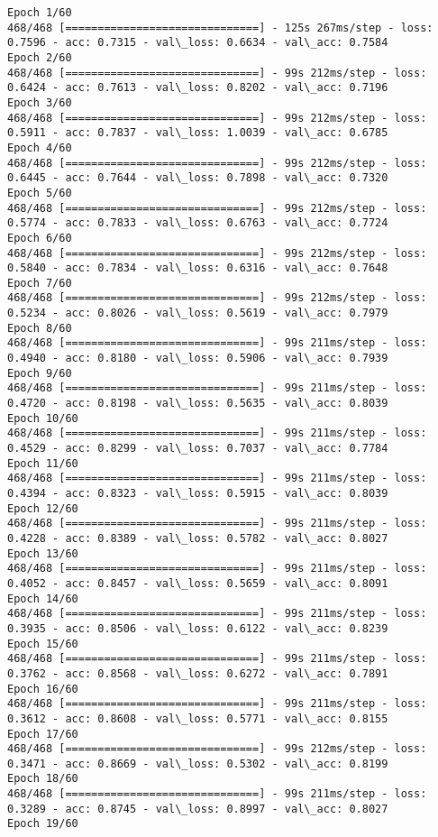 \documentclass[11pt]{article}
\begin{document}
    \begin{Verbatim}[commandchars=\\\{\}]
Epoch 1/60
468/468 [==============================] - 125s 267ms/step - loss: 0.7596 - acc: 0.7315 - val\_loss: 0.6634 - val\_acc: 0.7584
Epoch 2/60
468/468 [==============================] - 99s 212ms/step - loss: 0.6424 - acc: 0.7613 - val\_loss: 0.8202 - val\_acc: 0.7196
Epoch 3/60
468/468 [==============================] - 99s 212ms/step - loss: 0.5911 - acc: 0.7837 - val\_loss: 1.0039 - val\_acc: 0.6785
Epoch 4/60
468/468 [==============================] - 99s 212ms/step - loss: 0.6445 - acc: 0.7644 - val\_loss: 0.7898 - val\_acc: 0.7320
Epoch 5/60
468/468 [==============================] - 99s 212ms/step - loss: 0.5774 - acc: 0.7833 - val\_loss: 0.6763 - val\_acc: 0.7724
Epoch 6/60
468/468 [==============================] - 99s 212ms/step - loss: 0.5840 - acc: 0.7834 - val\_loss: 0.6316 - val\_acc: 0.7648
Epoch 7/60
468/468 [==============================] - 99s 212ms/step - loss: 0.5234 - acc: 0.8026 - val\_loss: 0.5619 - val\_acc: 0.7979
Epoch 8/60
468/468 [==============================] - 99s 211ms/step - loss: 0.4940 - acc: 0.8180 - val\_loss: 0.5906 - val\_acc: 0.7939
Epoch 9/60
468/468 [==============================] - 99s 211ms/step - loss: 0.4720 - acc: 0.8198 - val\_loss: 0.5635 - val\_acc: 0.8039
Epoch 10/60
468/468 [==============================] - 99s 211ms/step - loss: 0.4529 - acc: 0.8299 - val\_loss: 0.7037 - val\_acc: 0.7784
Epoch 11/60
468/468 [==============================] - 99s 211ms/step - loss: 0.4394 - acc: 0.8323 - val\_loss: 0.5915 - val\_acc: 0.8039
Epoch 12/60
468/468 [==============================] - 99s 211ms/step - loss: 0.4228 - acc: 0.8389 - val\_loss: 0.5782 - val\_acc: 0.8027
Epoch 13/60
468/468 [==============================] - 99s 211ms/step - loss: 0.4052 - acc: 0.8457 - val\_loss: 0.5659 - val\_acc: 0.8091
Epoch 14/60
468/468 [==============================] - 99s 211ms/step - loss: 0.3935 - acc: 0.8506 - val\_loss: 0.6122 - val\_acc: 0.8239
Epoch 15/60
468/468 [==============================] - 99s 211ms/step - loss: 0.3762 - acc: 0.8568 - val\_loss: 0.6272 - val\_acc: 0.7891
Epoch 16/60
468/468 [==============================] - 99s 211ms/step - loss: 0.3612 - acc: 0.8608 - val\_loss: 0.5771 - val\_acc: 0.8155
Epoch 17/60
468/468 [==============================] - 99s 212ms/step - loss: 0.3471 - acc: 0.8669 - val\_loss: 0.5302 - val\_acc: 0.8199
Epoch 18/60
468/468 [==============================] - 99s 211ms/step - loss: 0.3289 - acc: 0.8745 - val\_loss: 0.8997 - val\_acc: 0.8027
Epoch 19/60

\end{Verbatim}
\end{document}
